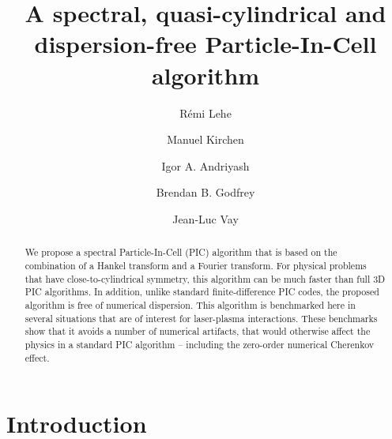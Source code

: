 \documentclass[1p,times,authoryear]{elsarticle}
\title{A spectral, quasi-cylindrical and dispersion-free Particle-In-Cell algorithm}
\author[label1]{R\'emi {Lehe}}
\author[label2]{Manuel {Kirchen}}
\author[label3]{Igor A. {Andriyash}}
\author[label4]{Brendan B. {Godfrey}}
\author[label1]{Jean-Luc {Vay}}
\begin{document}
\begin{abstract}
We propose a spectral Particle-In-Cell (PIC) algorithm that is based 
on the combination of a Hankel transform and a Fourier transform. 
For physical problems that have close-to-cylindrical symmetry, this
algorithm can be much faster than full 3D PIC algorithms. In addition,
unlike standard finite-difference PIC codes, the proposed algorithm is free of numerical
dispersion. This algorithm is benchmarked here in several situations that
are of interest for laser-plasma interactions. These
benchmarks show that it avoids a number of numerical artifacts, that
would otherwise affect the physics in a standard PIC algorithm -- 
including the zero-order numerical Cherenkov effect.
\end{abstract}

\maketitle

\section*{Introduction}
\end{document}
